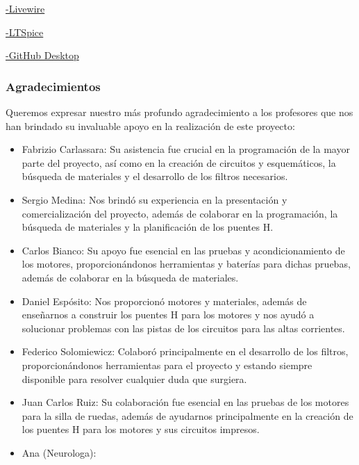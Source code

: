 \documentclass{article}
\begin{document}
    \href{https://livewire.laravel.com/}{-Livewire}
    \newline

    \href{https://www.analog.com/en/resources/design-tools-and-calculators/ltspice-simulator.html}{-LTSpice}
    \newline

    \href{https://github.com/apps/desktop}{-GitHub Desktop}

\subsubsection{Agradecimientos}

Queremos expresar nuestro más profundo agradecimiento a los profesores que nos han brindado su invaluable apoyo en la realización de este proyecto:
\begin{itemize}
    \item Fabrizio Carlassara: Su asistencia fue crucial en la programación de la mayor parte del proyecto, así como en la creación de circuitos y esquemáticos, la búsqueda de materiales y el desarrollo de los filtros necesarios.
    \item Sergio Medina: Nos brindó su experiencia en la presentación y comercialización del proyecto, además de colaborar en la programación, la búsqueda de materiales y la planificación de los puentes H.
    \item Carlos Bianco: Su apoyo fue esencial en las pruebas y acondicionamiento de los motores, proporcionándonos herramientas y baterías para dichas pruebas, además de colaborar en la búsqueda de materiales.
    \item Daniel Espósito: Nos proporcionó motores y materiales, además de enseñarnos a construir los puentes H para los motores y nos ayudó a solucionar problemas con las pistas de los circuitos para las altas corrientes.
    \item Federico Solomiewicz: Colaboró principalmente en el desarrollo de los filtros, proporcionándonos herramientas para el proyecto y estando siempre disponible para resolver cualquier duda que surgiera.
    \item Juan Carlos Ruiz: Su colaboración fue esencial en las pruebas de los motores para la silla de ruedas, además de ayudarnos principalmente en la creación de los puentes H para los motores y sus circuitos impresos.
    \item Ana (Neurologa):
\end{itemize}
\end{document}
